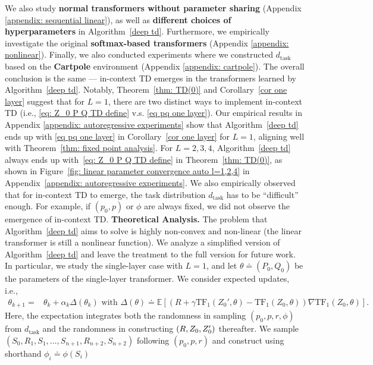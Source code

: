 \documentclass{article}
\newcommand{\newtext}[1]{{#1}}
\newcommand{\E}{\mathbb{E}}
\newcommand{\tb}[1]{{\textbf{#1}}}
\newcommand{\tf}{\text{TF}}
\begin{document}
We also study \tb{normal transformers without parameter sharing }(Appendix \ref{appendix: sequential linear}),
as well as \tb{different choices of hyperparameters} in Algorithm~\ref{deep td}.
Furthermore, we empirically investigate the original \tb{softmax-based transformers} (Appendix \ref{appendix: nonlinear}). \newtext{Finally, we also conducted experiments where we constructed $d_{\text{task}}$ based on the \textbf{Cartpole} environment \citep{brockman2016openai} (Appendix \ref{appendix: cartpole})}.
The overall conclusion is the same --- in-context TD emerges in the transformers learned by Algorithm~\ref{deep td}.
Notably, Theorem~\ref{thm: TD(0)} and Corollary~\ref{cor one layer} suggest that for $L=1$,
there are two distinct ways to implement in-context TD (i.e., \eqref{eq: Z_0 P Q TD define} v.s. \eqref{eq pq one layer}).
Our empirical results in Appendix \ref{appendix: autoregressive experiments} show that Algorithm~\ref{deep td} ends up with \eqref{eq pq one layer} in Corollary~\ref{cor one layer} for $L=1$,
aligning well with Theorem~\ref{thm: fixed point analysis}.
For $L=2,3,4$,
Algorithm~\ref{deep td} always ends up with~\eqref{eq: Z_0 P Q TD define} in Theorem~\ref{thm: TD(0)},
as shown in Figure~\ref{fig: linear parameter convergence auto l=1,2,4} in Appendix~\ref{appendix: autoregressive experiments}.
We also empirically observed that for in-context TD to emerge,
the task distribution $d_\text{task}$ has to be ``difficult'' enough.
For example,
if $(p_0, p)$ or $\phi$ are always fixed,
we did not observe the emergence of in-context TD.
\tb{Theoretical Analysis.}
The problem that Algorithm~\ref{deep td} aims to solve is highly non-convex and non-linear (the linear transformer is still a nonlinear function).
We analyze a simplified version of Algorithm~\ref{deep td} and leave the treatment to the full version for future work.
In particular,
we study the single-layer case with $L=1$,
and let $\theta \doteq (P_0, Q_0)$ be the parameters of the single-layer transformer.
We consider expected updates, i.e.,
\begin{align}
    \!\!\!\!\!\!\!
    \theta_{k+1} =& \theta_k + \alpha_k \Delta(\theta_k) \text{ with }
    \Delta(\theta) \doteq \E\left[(R + \gamma \tf_1(Z_0', \theta) - \tf_1(Z_0, \theta)) \nabla \tf_1(Z_0, \theta)\right]. \label{eq: expected theta update}
\end{align}
Here, the expectation integrates both the randomness in sampling $(p_0, p, r, \phi)$ from $d_\text{task}$ and the randomness in constructing $\qty(R, Z_0, Z_0')$ thereafter.
 We sample $(S_0, R_1, S_1, \dots, S_{n+1}, R_{n+2}, S_{n+2})$ following $(p_0, p, r)$ and construct using shorthand $\phi_i \doteq \phi(S_i)$
\end{document}
